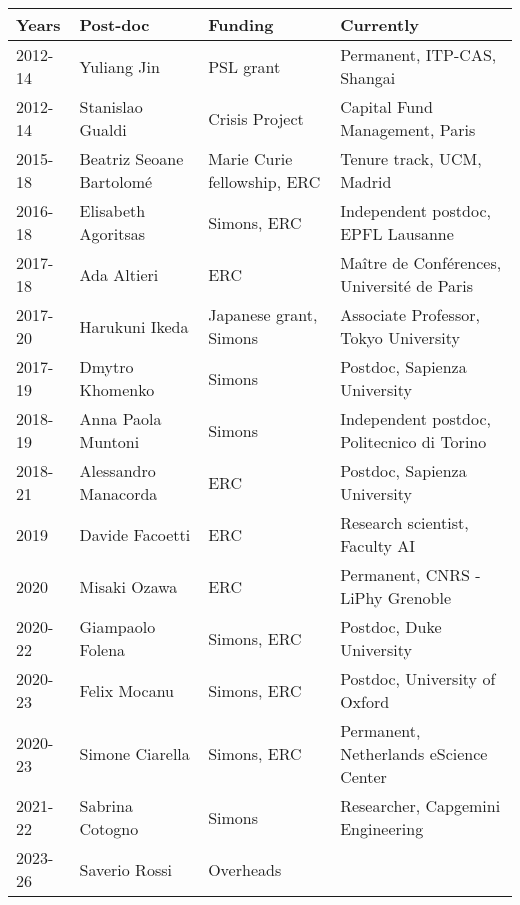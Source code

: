 \documentclass[a4paper,10pt]{article}
\begin{document}

\begin{table}[h]
\begin{tabular}{llll}
Years & Post-doc & Funding  & Currently\\
\hline
2012-14 & Yuliang Jin & PSL grant  & Permanent, ITP-CAS, Shangai \\
2012-14 & Stanislao Gualdi &  Crisis Project & Capital Fund Management, Paris \\
2015-18 & Beatriz Seoane Bartolom\'e & Marie Curie fellowship, ERC & Tenure track, UCM, Madrid \\
2016-18 & Elisabeth Agoritsas & Simons, ERC & Independent postdoc, EPFL Lausanne \\
2017-18 & Ada Altieri & ERC & Ma\^itre de Conf\'erences, Universit\'e de Paris \\
2017-20 & Harukuni Ikeda & Japanese grant, Simons & Associate Professor, Tokyo University \\
2017-19 & Dmytro Khomenko & Simons & Postdoc, Sapienza University \\
2018-19 & Anna Paola Muntoni & Simons & Independent postdoc, Politecnico di Torino \\
2018-21 & Alessandro Manacorda & ERC & Postdoc, Sapienza University \\
2019 & Davide Facoetti & ERC & Research scientist, Faculty AI  \\
2020 & Misaki Ozawa & ERC & Permanent, CNRS - LiPhy Grenoble \\
2020-22 & Giampaolo Folena & Simons, ERC & Postdoc, Duke University \\
2020-23 & Felix Mocanu & Simons, ERC & Postdoc, University of Oxford \\
2020-23 & Simone Ciarella & Simons, ERC & Permanent, Netherlands eScience Center\\
2021-22 & Sabrina Cotogno & Simons & Researcher, Capgemini Engineering \\
2023-26 & Saverio Rossi & Overheads & \\
\end{tabular}
\end{table}







\newpage

\\

\vskip-5pt
\end{document}
